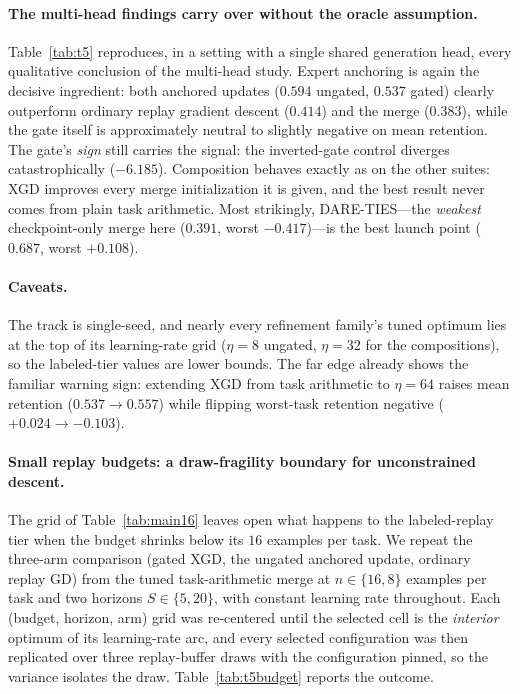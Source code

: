 \documentclass{article} %
\begin{document}
\paragraph{The multi-head findings carry over without the oracle assumption.}
Table~\ref{tab:t5} reproduces, in a setting with a single shared generation head, every qualitative conclusion of the multi-head study. Expert anchoring is again the decisive ingredient: both anchored updates ($0.594$ ungated, $0.537$ gated) clearly outperform ordinary replay gradient descent ($0.414$) and the merge ($0.383$), while the gate itself is approximately neutral to slightly negative on mean retention. The gate's \emph{sign} still carries the signal: the inverted-gate control diverges catastrophically ($-6.185$). Composition behaves exactly as on the other suites: XGD improves every merge initialization it is given, and the best result never comes from plain task arithmetic. Most strikingly, DARE-TIES---the \emph{weakest} checkpoint-only merge here ($0.391$, worst $-0.417$)---is the best launch point ($\mathbf{0.687}$, worst $+0.108$).

\paragraph{Caveats.}
The track is single-seed, and nearly every refinement family's tuned optimum lies at the top of its learning-rate grid ($\eta=8$ ungated, $\eta=32$ for the compositions), so the labeled-tier values are lower bounds. The far edge already shows the familiar warning sign: extending XGD from task arithmetic to $\eta=64$ raises mean retention ($0.537\to0.557$) while flipping worst-task retention negative ($+0.024\to-0.103$).
\fi

\paragraph{Small replay budgets: a draw-fragility boundary for unconstrained descent.}
The grid of Table~\ref{tab:main16} leaves open what happens to the labeled-replay tier when the budget shrinks below its $16$ examples per task. We repeat the three-arm comparison (gated XGD, the ungated anchored update, ordinary replay GD) from the tuned task-arithmetic merge at $n\in\{16,8\}$ examples per task and two horizons $S\in\{5,20\}$, with constant learning rate throughout. Each (budget, horizon, arm) grid was re-centered until the selected cell is the \emph{interior} optimum of its learning-rate arc, and every selected configuration was then replicated over three replay-buffer draws with the configuration pinned, so the variance isolates the draw. Table~\ref{tab:t5budget} reports the outcome.
\end{document}
